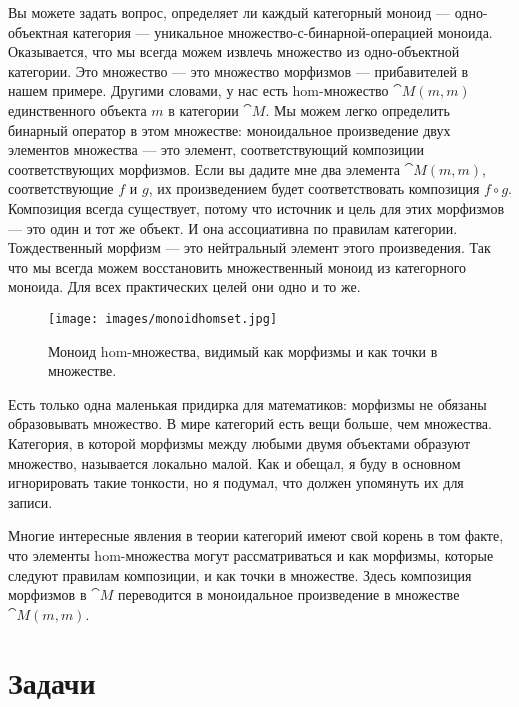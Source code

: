 Вы можете задать вопрос, определяет ли каждый категорный моноид ---
одно-объектная категория --- уникальное множество-с-бинарной-операцией
моноида. Оказывается, что мы всегда можем извлечь множество из
одно-объектной категории. Это множество --- это множество морфизмов --- прибавителей
в нашем примере. Другими словами, у нас есть hom-множество $\cat{M}(m, m)$
единственного объекта $m$ в категории $\cat{M}$. Мы можем легко определить бинарный
оператор в этом множестве: моноидальное произведение двух элементов множества --- это
элемент, соответствующий композиции соответствующих морфизмов.
Если вы дадите мне два элемента $\cat{M}(m, m)$, соответствующие $f$ и
$g$, их произведением будет соответствовать композиция
$f \circ g$. Композиция всегда существует, потому что источник и
цель для этих морфизмов --- это один и тот же объект. И она ассоциативна по
правилам категории. Тождественный морфизм --- это нейтральный элемент
этого произведения. Так что мы всегда можем восстановить множественный моноид из категорного
моноида. Для всех практических целей они одно и то же.

\begin{figure}[H]
  \centering
  \texttt{[image: images/monoidhomset.jpg]}
  \caption{Моноид hom-множества, видимый как морфизмы и как точки в множестве.}
\end{figure}

\noindent
Есть только одна маленькая придирка для математиков: морфизмы не
обязаны образовывать множество. В мире категорий есть вещи больше,
чем множества. Категория, в которой морфизмы между любыми двумя объектами образуют
множество, называется локально малой. Как и обещал, я буду в основном игнорировать такие
тонкости, но я подумал, что должен упомянуть их для записи.

Многие интересные явления в теории категорий имеют свой корень в
том факте, что элементы hom-множества могут рассматриваться и как морфизмы, которые
следуют правилам композиции, и как точки в множестве. Здесь
композиция морфизмов в $\cat{M}$ переводится в моноидальное произведение в
множестве $\cat{M}(m, m)$.

\section{Задачи}

